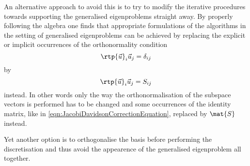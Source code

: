 % 
%

An alternative approach to avoid this
is to try to modify the iterative procedures towards supporting the generalised
eigenproblems straight away.
By properly following the algebra one finds that
appropriate formulations of the algorithms in the setting of generalised
eigenproblems can be achieved by replacing the explicit or implicit
occurrences of the orthonormality condition
\[ \rtp{\vec{u}}_i \vec{u}_j = \delta_{ij} \]
by
\[  \rtp{\vec{u}}_i \vec{u}_j = S_{ij} \]
instead.
In other words only the way the orthonormalisation of the subspace vectors
is performed has to be changed
and some occurrences of the identity matrix,
like in \eqref{eqn:JacobiDavidsonCorrectionEquation},
replaced by $\mat{S}$ instead.

Yet another option is to orthogonalise the basis before performing
the discretisation and thus avoid the appearence of the generalised
eigenproblem all together.


%





